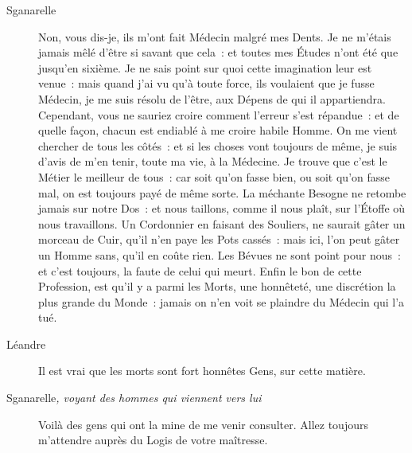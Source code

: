 \documentclass[french,twoside]{book} %
\begin{document}
 \begin{description} \item[Sganarelle] 

Non, vous dis-je, ils m’ont fait Médecin malgré mes Dents. Je ne m’étais jamais mêlé d’être si savant que cela : et toutes mes Études n’ont été que jusqu’en sixième. Je ne sais point sur quoi cette imagination leur est venue : mais quand j’ai vu qu’à toute force, ils voulaient que je fusse Médecin, je me suis résolu de l’être, aux Dépens de qui il appartiendra. Cependant, vous ne sauriez croire comment l’erreur s’est répandue : et de quelle façon, chacun est endiablé à me croire habile Homme. On me vient chercher de tous les côtés : et si les choses vont toujours de même, je suis d’avis de m’en tenir, toute ma vie, à la Médecine. Je trouve que c’est le Métier le meilleur de tous : car soit qu’on fasse bien, ou soit qu’on fasse mal, on est toujours payé de même sorte. La méchante Besogne ne retombe jamais sur notre Dos : et nous taillons, comme il nous plaît, sur l’Étoffe où nous travaillons. Un Cordonnier en faisant des Souliers, ne saurait gâter un morceau de Cuir, qu’il n’en paye les Pots cassés : mais ici, l’on peut gâter un Homme sans, qu’il en coûte rien. Les Bévues ne sont point pour nous : et c’est toujours, la faute de celui qui meurt. Enfin le bon de cette Profession, est qu’il y a parmi les Morts, une honnêteté, une discrétion la plus grande du Monde : jamais on n’en voit se plaindre du Médecin qui l’a tué.\end{description}
 \begin{description} \item[Léandre] 

Il est vrai que les morts sont fort honnêtes Gens, sur cette matière.\end{description}
 \begin{description} \item[Sganarelle\textit{, voyant des hommes qui viennent vers lui}\par
] 

Voilà des gens qui ont la mine de me venir consulter. Allez toujours m’attendre auprès du Logis de votre maîtresse.\end{description}
\end{document}
